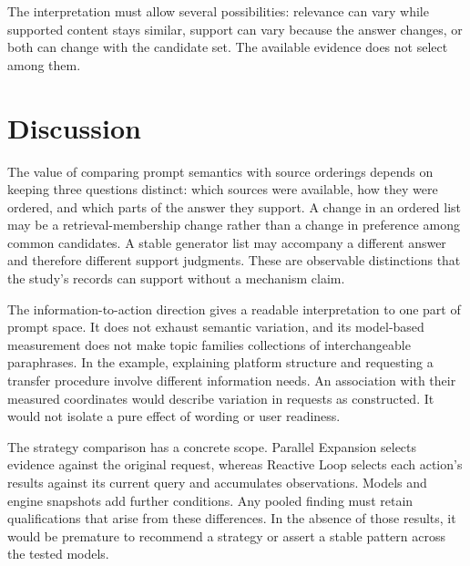  The interpretation must allow several possibilities: relevance can vary while supported content stays similar, support can vary because the answer changes, or both can change with the candidate set. The available evidence does not select among them.

\section{Discussion}
The value of comparing prompt semantics with source orderings depends on keeping three questions distinct: which sources were available, how they were ordered, and which parts of the answer they support. A change in an ordered list may be a retrieval-membership change rather than a change in preference among common candidates. A stable generator list may accompany a different answer and therefore different support judgments. These are observable distinctions that the study's records can support without a mechanism claim.

The information-to-action direction gives a readable interpretation to one part of prompt space. It does not exhaust semantic variation, and its model-based measurement does not make topic families collections of interchangeable paraphrases. In the example, explaining platform structure and requesting a transfer procedure involve different information needs. An association with their measured coordinates would describe variation in requests as constructed. It would not isolate a pure effect of wording or user readiness.

The strategy comparison has a concrete scope. Parallel Expansion selects evidence against the original request, whereas Reactive Loop selects each action's results against its current query and accumulates observations. Models and engine snapshots add further conditions. Any pooled finding must retain qualifications that arise from these differences.  In the absence of those results, it would be premature to recommend a strategy or assert a stable pattern across the tested models.

